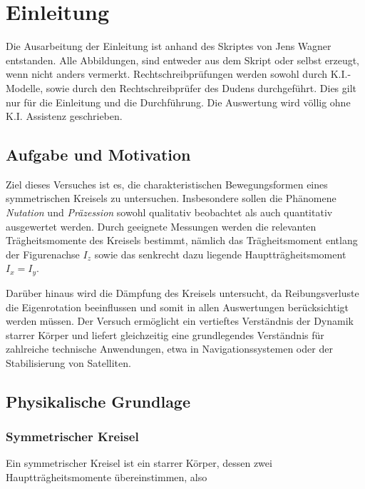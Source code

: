 \chapter{Einleitung} \label{ch:Einleitung}

Die Ausarbeitung der Einleitung ist anhand des Skriptes von Jens Wagner entstanden. Alle Abbildungen, sind entweder aus dem Skript oder selbst erzeugt, wenn nicht anders vermerkt. Rechtschreibprüfungen werden sowohl durch K.I.-Modelle, sowie durch den Rechtschreibprüfer des Dudens durchgeführt.  Dies gilt nur für die Einleitung und die Durchführung. Die Auswertung wird völlig ohne K.I. Assistenz geschrieben. \cite{skriptPAP21, Duden}

\section{Aufgabe und Motivation} \label{sec:AuM}

Ziel dieses Versuches ist es, die charakteristischen Bewegungsformen eines symmetrischen Kreisels zu untersuchen. 
Insbesondere sollen die Phänomene \emph{Nutation} und \emph{Präzession} sowohl qualitativ beobachtet als auch quantitativ ausgewertet werden. 
Durch geeignete Messungen werden die relevanten Trägheitsmomente des Kreisels bestimmt, nämlich das Trägheitsmoment entlang der Figurenachse $I_z$ sowie das senkrecht dazu liegende Hauptträgheitsmoment $I_x = I_y$. 

Darüber hinaus wird die Dämpfung des Kreisels untersucht, da Reibungsverluste die Eigenrotation beeinflussen und somit in allen Auswertungen berücksichtigt werden müssen.  
Der Versuch ermöglicht ein vertieftes Verständnis der Dynamik starrer Körper und liefert gleichzeitig eine grundlegendes Verständnis für zahlreiche technische Anwendungen, etwa in Navigationssystemen oder der Stabilisierung von Satelliten.

\section{Physikalische Grundlage} \label{sec:PhyBasics}

\subsection{Symmetrischer Kreisel}\label{ssec:SymKrei}

Ein symmetrischer Kreisel ist ein starrer Körper, dessen zwei Hauptträgheitsmomente übereinstimmen, also

